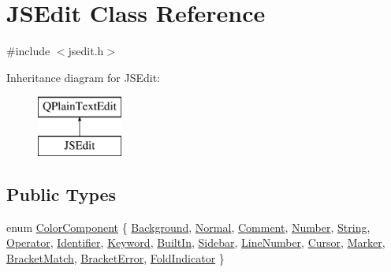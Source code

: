 \hypertarget{class_j_s_edit}{}\section{J\+S\+Edit Class Reference}
\label{class_j_s_edit}


{\ttfamily \#include $<$jsedit.\+h$>$}

Inheritance diagram for J\+S\+Edit\+:\begin{figure}[H]
\begin{center}
\leavevmode
\includegraphics[height=2.000000cm]{class_j_s_edit}
\end{center}
\end{figure}
\subsection*{Public Types}
\begin{DoxyCompactItemize}
\item 
enum \hyperlink{class_j_s_edit_a5a465193a1344e5be9b04f5ff7883213}{Color\+Component} \{ \newline
\hyperlink{class_j_s_edit_a5a465193a1344e5be9b04f5ff7883213a79b93a41435ddfd6b670821e7be31306}{Background}, 
\hyperlink{class_j_s_edit_a5a465193a1344e5be9b04f5ff7883213a51b1886888e6bf8841064a795bd6ab8d}{Normal}, 
\hyperlink{class_j_s_edit_a5a465193a1344e5be9b04f5ff7883213a430947e4b883553d04f618a799095f4d}{Comment}, 
\hyperlink{class_j_s_edit_a5a465193a1344e5be9b04f5ff7883213aeebc6c595d9a8bc74d3b03bd4c8f2d1f}{Number}, 
\newline
\hyperlink{class_j_s_edit_a5a465193a1344e5be9b04f5ff7883213a60b69a2cc0268b2048fceadf7067e231}{String}, 
\hyperlink{class_j_s_edit_a5a465193a1344e5be9b04f5ff7883213a7cf7fcdce0c49ff9995b8d8a02a3b127}{Operator}, 
\hyperlink{class_j_s_edit_a5a465193a1344e5be9b04f5ff7883213a06246136a94298b2d147a9d3dea7fd89}{Identifier}, 
\hyperlink{class_j_s_edit_a5a465193a1344e5be9b04f5ff7883213ad70548abdd876f2648764b7924b90251}{Keyword}, 
\newline
\hyperlink{class_j_s_edit_a5a465193a1344e5be9b04f5ff7883213a8b227288b9e8c72ccb15968f3127f6c2}{Built\+In}, 
\hyperlink{class_j_s_edit_a5a465193a1344e5be9b04f5ff7883213acda2a01a6da3090252b320a2c4b99133}{Sidebar}, 
\hyperlink{class_j_s_edit_a5a465193a1344e5be9b04f5ff7883213a43eb7503aa3a0f0520a2ad5c71b4d419}{Line\+Number}, 
\hyperlink{class_j_s_edit_a5a465193a1344e5be9b04f5ff7883213a5438637d9a462daaa47e0fdea5f342cc}{Cursor}, 
\newline
\hyperlink{class_j_s_edit_a5a465193a1344e5be9b04f5ff7883213a098e62a1854a46cb2b58c49ee5d78208}{Marker}, 
\hyperlink{class_j_s_edit_a5a465193a1344e5be9b04f5ff7883213a0c0c2038c38e75704e991bcf7c63dc7f}{Bracket\+Match}, 
\hyperlink{class_j_s_edit_a5a465193a1344e5be9b04f5ff7883213af2e19200abafb0bf0534dd89fd73c63b}{Bracket\+Error}, 
\hyperlink{class_j_s_edit_a5a465193a1344e5be9b04f5ff7883213a364777f3c240e11db6d1d2a8c7b9962d}{Fold\+Indicator}
 \}
\end{DoxyCompactItemize}
